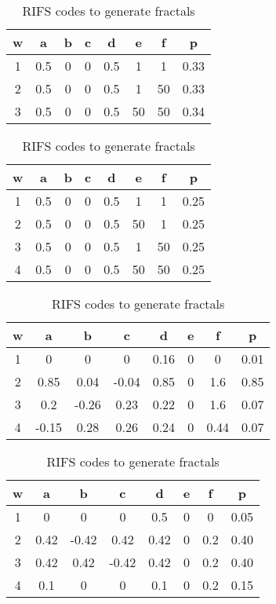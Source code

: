 \begin{table}[ht]
\caption{RIFS codes to generate fractals} 
	\centering 
	\begin{tabular}{c c c c c c c c} 
	\hline\hline 
	w & a & b & c & d & e & f & p\\ [0.5ex] 
	\hline 
	1 & 0.5 & 0 & 0 & 0.5 & 1 & 1 & 0.33 \\
	2 & 0.5 & 0 & 0 & 0.5 & 1 & 50 & 0.33\\
	3 & 0.5 & 0 & 0 & 0.5 & 50 & 50 & 0.34 \\
	\hline 
\end{tabular}
\bigskip
	\centering 
	\begin{tabular}{c c c c c c c c} 
	\hline\hline 
	w & a & b & c & d & e & f & p\\ [0.5ex] 
	\hline 
	1 & 0.5 & 0 & 0 & 0.5 & 1 & 1 & 0.25\\
	2 & 0.5 & 0 & 0 & 0.5 & 50 & 1 & 0.25\\
	3 & 0.5 & 0 & 0 & 0.5 & 1 & 50 & 0.25\\
	4 & 0.5 & 0 & 0 & 0.5 & 50 & 50 & 0.25\\
	\hline 
\end{tabular}
\bigskip
	\centering 
	\begin{tabular}{c c c c c c c c} 
	\hline\hline 
	w & a & b & c & d & e & f & p\\ [0.5ex] 
	\hline 
	1 & 0 & 0 & 0 & 0.16 & 0 & 0 & 0.01 \\
	2 & 0.85 & 0.04 & -0.04 & 0.85 & 0 & 1.6 & 0.85\\
	3 & 0.2 & -0.26 & 0.23 & 0.22 & 0 & 1.6 & 0.07 \\
	4 & -0.15 & 0.28 & 0.26 & 0.24 & 0 & 0.44 & 0.07 \\
	\hline 
\end{tabular}
\bigskip
	\centering 
	\begin{tabular}{c c c c c c c c} 
	\hline\hline 
	w & a & b & c & d & e & f & p\\ [0.5ex] 
	\hline 
	1 & 0 & 0 & 0 & 0.5 & 0 & 0 & 0.05 \\
	2 & 0.42 & -0.42 & 0.42 & 0.42 & 0 & 0.2 & 0.40\\
	3 & 0.42 & 0.42 & -0.42 & 0.42 & 0 & 0.2 & 0.40\\
	4 & 0.1 & 0 & 0 & 0.1 & 0 & 0.2 & 0.15 \\
	\hline 
\end{tabular}
\end{table} \label{table:RIFS}


